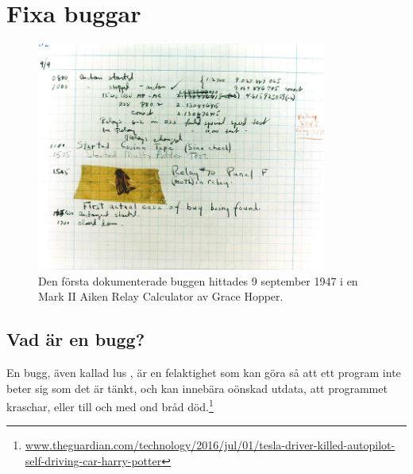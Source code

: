 
\chapter{Fixa buggar}\label{appendix:debug}

\begin{figure}[H]
\centering\includegraphics[width=0.85\textwidth]{../img/bug}

\caption{Den första dokumenterade buggen hittades 9 september 1947 i en Mark II Aiken Relay Calculator av Grace Hopper.\protect\footnotemark}

\end{figure}


\section{Vad är en bugg?}

En bugg, även kallad lus , är en felaktighet som kan göra så att ett program inte beter sig som det är tänkt, och kan innebära oönskad utdata, att programmet kraschar, eller till och med ond bråd död.\footnote{\href{https://www.theguardian.com/technology/2016/jul/01/tesla-driver-killed-autopilot-self-driving-car-harry-potter}{www.theguardian.com/technology/2016/jul/01/tesla-driver-killed-autopilot-self-driving-car-harry-potter}}

